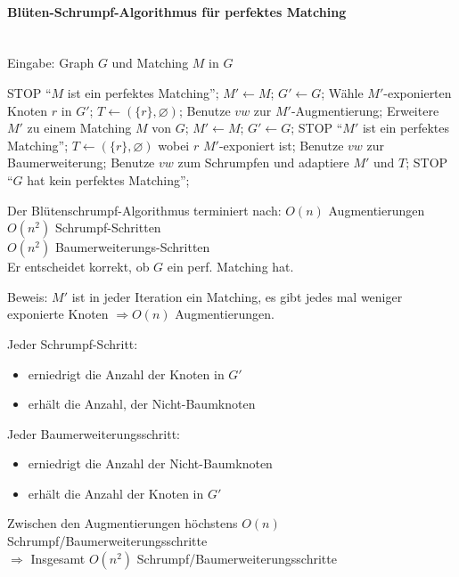 \paragraph{Blüten-Schrumpf-Algorithmus für perfektes Matching}\mbox{}\\
Eingabe: Graph $G$ und Matching $M$ in $G$


\begin{algorithmic}
\STATE STOP "`$M$ ist ein perfektes Matching"';
\ENDIF
\STATE $M' \leftarrow M$;
\STATE $G' \leftarrow G$;
\STATE Wähle $M'$-exponierten Knoten $r$ in $G'$;
\STATE $T \leftarrow (\{r\},\varnothing)$;
\STATE Benutze $vw$ zur $M'$-Augmentierung;
\STATE Erweitere $M'$ zu einem Matching $M$ von $G$;
\STATE $M' \leftarrow M$;
\STATE $G' \leftarrow G$;
\STATE STOP "`$M'$ ist ein perfektes Matching"';
\ELSE 
\STATE $T \leftarrow (\{r\},\varnothing)$ wobei $r$ $M'$-exponiert ist;
\ENDIF
\ENDCASE
{}
\STATE Benutze $vw$ zur Baumerweiterung;
\ENDCASE
{}
\STATE Benutze $vw$ zum Schrumpfen und adaptiere $M'$ und $T$;
\ENDCASE
\ENDWHILE
\STATE STOP "`$G$ hat kein perfektes Matching"';
\end{algorithmic}

\begin{satz}
Der Blütenschrumpf-Algorithmus terminiert nach:
$O(n)$ Augmentierungen\\
$O(n^2)$ Schrumpf-Schritten\\
$O(n^2)$ Baumerweiterungs-Schritten\\
Er entscheidet korrekt, ob $G$ ein perf. Matching hat.
\end{satz}
Beweis: $M'$ ist in jeder Iteration ein Matching, es gibt jedes mal weniger
exponierte Knoten $\Rightarrow O(n)$ Augmentierungen.

Jeder Schrumpf-Schritt:
\begin{itemize}
\item erniedrigt die Anzahl der Knoten in $G'$
\item erhält die Anzahl, der Nicht-Baumknoten
\end{itemize}
Jeder Baumerweiterungsschritt:
\begin{itemize}
\item erniedrigt die Anzahl der Nicht-Baumknoten
\item erhält die Anzahl der Knoten in $G'$
\end{itemize}
Zwischen den Augmentierungen höchstens $O(n)$
Schrumpf/Baumerweiterungsschritte\\
$\Rightarrow$ Insgesamt $O(n^2)$ Schrumpf/Baumerweiterungsschritte


